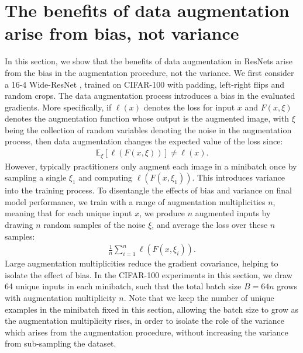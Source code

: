 \documentclass{article}
\begin{document}
\section{The benefits of data augmentation arise from bias, not variance}
\label{sec:growing_batch}
In this section, we show that the benefits of data augmentation in ResNets arise from the bias in the augmentation procedure, not the variance. We first consider a 16-4 Wide-ResNet \citep{zagoruyko2016wide}, trained on CIFAR-100 \citep{krizhevsky2009learning} with padding, left-right flips and random crops. The data augmentation process introduces a bias in the evaluated gradients. More specifically, if $\ell(x)$ denotes the loss for input $x$ and $F(x, \xi)$ denotes the augmentation function whose output is the augmented image, with $\xi$ being the collection of random variables denoting the noise in the augmentation process, then data augmentation changes the expected value of the loss since:
\begin{align}
    \mathbb{E}_\xi [\ell(F(x, \xi))] \neq \ell(x).
\end{align}
However, typically practitioners only augment each image in a minibatch once by sampling a single $\xi_1$ and computing $\ell(F(x, \xi_1))$. This introduces variance into the training process. To disentangle the effects of bias and variance on final model performance, we train with a range of augmentation multiplicities $n$, meaning that for each unique input $x$, we produce $n$ augmented inputs by drawing $n$ random samples of the noise $\xi$, and average the loss over these $n$ samples:
\begin{align}
    \frac{1}{n} \sum_{i=1}^n \ell(F(x, \xi_i)).
\end{align}
Large augmentation multiplicities reduce the gradient covariance, helping to isolate the effect of bias. In the CIFAR-100 experiments in this section, we draw 64 unique inputs in each minibatch, such that the total batch size $B=64n$ grows with augmentation multiplicity $n$. Note that we keep the number of unique examples in the minibatch fixed in this section, allowing the batch size to grow as the augmentation multiplicity rises, in order to isolate the role of the variance which arises from the augmentation procedure, without increasing the variance from sub-sampling the dataset.
\end{document}
